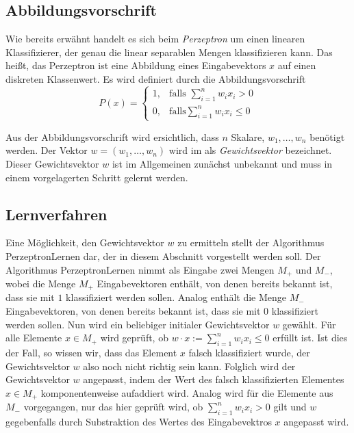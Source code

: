 \documentclass[a4paper]{scrartcl}
\begin{document}
\begin{multicols}{2}
            \subsection{Abbildungsvorschrift}
                Wie bereits erwähnt handelt es sich beim \emph{Perzeptron} um einen linearen Klassifizierer, der genau die linear separablen Mengen klassifizieren kann. Das heißt, das Perzeptron ist eine Abbildung eines Eingabevektors $x$ auf einen diskreten Klassenwert. Es wird definiert durch die Abbildungsvorschrift
                $$
            P(x)=\left\{\begin{array}{cl} 1, & \mbox{falls }\sum_{i=1}^nw_ix_i > 0\\ 0, & \mbox{falls} \sum_{i=1}^n w_ix_i \leq 0 \end{array}\right. 
                $$

                Aus der Abbildungsvorschrift wird ersichtlich, dass $n$ Skalare, $w_1,\dots,w_n$ benötigt werden. Der Vektor $w = (w_1,\dots, w_n)$ wird im als \emph{Gewichtsvektor} bezeichnet. Dieser Gewichtsvektor $w$ ist im Allgemeinen zunächst unbekannt und muss in einem vorgelagerten Schritt gelernt werden.
            \subsection{Lernverfahren}
                Eine Möglichkeit, den Gewichtsvektor $w$ zu ermitteln stellt der Algorithmus PerzeptronLernen dar, der in diesem Abschnitt vorgestellt werden soll. Der Algorithmus PerzeptronLernen nimmt als Eingabe zwei Mengen $M_+$ und $M_-$, wobei die Menge $M_+$ Eingabevektoren enthält, von denen bereits bekannt ist, dass sie mit $1$ klassifiziert werden sollen. Analog enthält die Menge $M_-$ Eingabevektoren, von denen bereits bekannt ist, dass sie mit $0$ klassifiziert werden sollen.
                \newline
                Nun wird ein beliebiger initialer Gewichtsvektor $w$ gewählt.
                \newline
                Für alle Elemente $x \in M_+$ wird geprüft, ob $w \cdot x := \sum_{i=1}^nw_ix_i \leq 0$ erfüllt ist. Ist dies der Fall, so wissen wir, dass das Element $x$ falsch klassifiziert wurde, der Gewichtsvektor $w$ also noch nicht richtig sein kann. Folglich wird der Gewichtsvektor $w$ angepasst, indem der Wert des falsch klassifizierten Elementes $x \in M_+$ komponentenweise aufaddiert wird.
                \newline
                Analog wird für die Elemente aus $M_-$ vorgegangen, nur das hier geprüft wird, ob $\sum_{i=1}^nw_ix_i > 0$ gilt und $w$ gegebenfalls durch Substraktion des Wertes des Eingabevektros $x$ angepasst wird.

\end{multicols}
\end{document}
